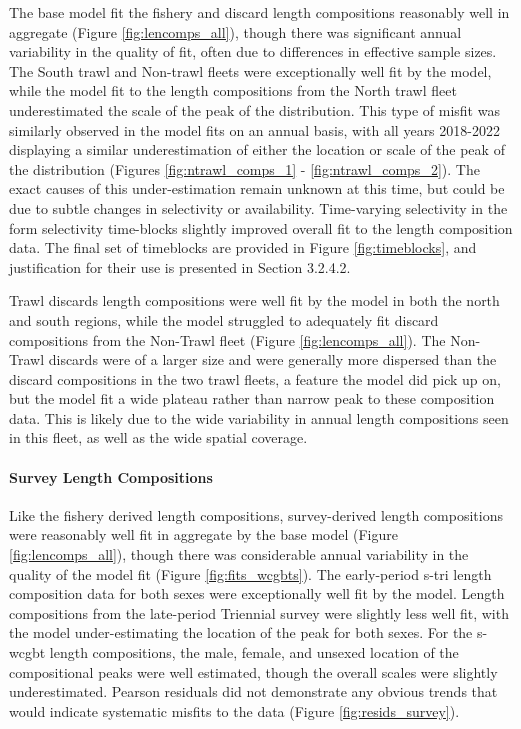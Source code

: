 \documentclass[11pt,
  english,
  letterpaper,
]{article}
\begin{document}
The base model fit the fishery and discard length compositions reasonably well in aggregate (Figure \ref{fig:lencomps_all}), though there was significant annual variability in the quality of fit, often due to differences in effective sample sizes. The South trawl and Non-trawl fleets were exceptionally well fit by the model, while the model fit to the length compositions from the North trawl fleet underestimated the scale of the peak of the distribution. This type of misfit was similarly observed in the model fits on an annual basis, with all years 2018-2022 displaying a similar underestimation of either the location or scale of the peak of the distribution (Figures \ref{fig:ntrawl_comps_1} - \ref{fig:ntrawl_comps_2}). The exact causes of this under-estimation remain unknown at this time, but could be due to subtle changes in selectivity or availability. Time-varying selectivity in the form selectivity time-blocks slightly improved overall fit to the length composition data. The final set of timeblocks are provided in Figure \ref{fig:timeblocks}, and justification for their use is presented in Section 3.2.4.2.

Trawl discards length compositions were well fit by the model in both the north and south regions, while the model struggled to adequately fit discard compositions from the Non-Trawl fleet (Figure \ref{fig:lencomps_all}). The Non-Trawl discards were of a larger size and were generally more dispersed than the discard compositions in the two trawl fleets, a feature the model did pick up on, but the model fit a wide plateau rather than narrow peak to these composition data. This is likely due to the wide variability in annual length compositions seen in this fleet, as well as the wide spatial coverage.

\hypertarget{survey-length-compositions}{%
\paragraph{Survey Length Compositions}\label{survey-length-compositions}}

Like the fishery derived length compositions, survey-derived length compositions were reasonably well fit in aggregate by the base model (Figure \ref{fig:lencomps_all}), though there was considerable annual variability in the quality of the model fit (Figure \ref{fig:fits_wcgbts}). The early-period \gls{s-tri} length composition data for both sexes were exceptionally well fit by the model. Length compositions from the late-period Triennial survey were slightly less well fit, with the model under-estimating the location of the peak for both sexes. For the \gls{s-wcgbt} length compositions, the male, female, and unsexed location of the compositional peaks were well estimated, though the overall scales were slightly underestimated. Pearson residuals did not demonstrate any obvious trends that would indicate systematic misfits to the data (Figure \ref{fig:resids_survey}).
\end{document}
